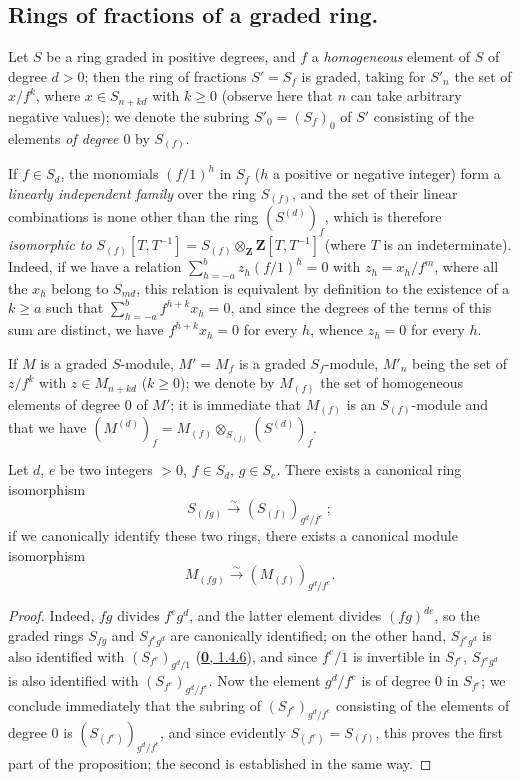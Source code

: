 \subsection{Rings of fractions of a graded ring.}
\label{subsection:II.2.2}

\begin{env}[2.2.1]
\label{II.2.2.1}
Let $S$ be a ring graded in positive degrees, and $f$ a
\emph{homogeneous} element of $S$ of degree $d>0$; then the ring of
fractions $S'=S_f$ is graded, taking for $S'_n$ the set of $x/f^k$, where
$x\in S_{n+kd}$ with $k\geq 0$ (observe here that $n$ can take arbitrary
negative values); we denote the subring $S'_0=(S_f)_0$ of $S'$
consisting of the elements \emph{of degree $0$} by
$S_{(f)}$.

If $f\in S_d$, the monomials $(f/1)^h$ in $S_f$ ($h$ a positive or
negative integer) form a \emph{linearly independent family} over the ring
$S_{(f)}$, and the set of their linear combinations is none other than
the ring $(S^{(d)})_f$, which is therefore \emph{isomorphic to
$S_{(f)}[T,T^{-1}]=S_{(f)}\otimes_{\mathbf{Z}}\mathbf{Z}[T,T^{-1}]$}
(where $T$ is an indeterminate). Indeed, if we have a relation
$\sum_{h=-a}^{b}z_h(f/1)^h=0$ with $z_h=x_h/f^m$, where all the $x_h$
belong to $S_{md}$, this relation is equivalent by definition to
the existence of a $k\geq a$ such that
$\sum_{h=-a}^{b}f^{h+k}x_h=0$, and since the degrees of the terms of this
sum are distinct, we have $f^{h+k}x_h=0$ for every $h$, whence $z_h=0$ for
every $h$.

If $M$ is a graded $S$-module, $M'=M_f$ is a graded $S_f$-module,
$M'_n$ being the set of $z/f^k$ with $z\in M_{n+kd}$ ($k\geq 0$); we
denote by $M_{(f)}$ the set of homogeneous elements of degree $0$ of
$M'$; it is immediate that $M_{(f)}$ is an $S_{(f)}$-module and that we have
$(M^{(d)})_f=M_{(f)}\otimes_{S_{(f)}}(S^{(d)})_f$.
\end{env}

\begin{lemma}[2.2.2]
\label{II.2.2.2}
Let $d$, $e$ be two integers $>0$, $f\in S_d$, $g\in S_e$. There exists a
canonical ring isomorphism
\[
  S_{(fg)}\xrightarrow{\sim}(S_{(f)})_{g^d/f^e}~;
\]
if we canonically identify these two rings, there exists a canonical module
isomorphism
\[
  M_{(fg)}\xrightarrow{\sim}(M_{(f)})_{g^d/f^e}.
\]
\end{lemma}

\begin{proof}
Indeed, $fg$ divides $f^e g^d$, and the latter element divides $(fg)^{de}$,
so the graded rings $S_{fg}$ and $S_{f^e g^d}$ are canonically
identified; on the other hand, $S_{f^e g^d}$ is also identified with
$(S_{f^e})_{g^d/1}$ (\hyperref[0.1.4.6]{\textbf{0}, 1.4.6}), and since $f^e/1$ is
invertible in $S_{f^e}$, $S_{f^e g^d}$ is also identified with
$(S_{f^e})_{g^d/f^e}$. Now the element $g^d/f^e$ is of degree $0$ in
$S_{f^e}$; we conclude immediately that the subring of
$(S_{f^e})_{g^d/f^e}$ consisting of the elements of degree $0$ is
$(S_{(f^e)})_{g^d/f^e}$, and since evidently
$S_{(f^e)}=S_{(f)}$, this proves the first part of the proposition;
the second is established in the same way.
\end{proof}

